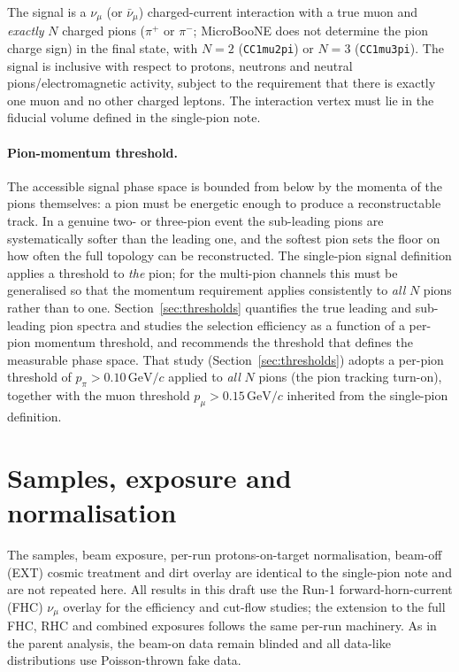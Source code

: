 \documentclass[11pt,a4paper]{article}
\newcommand{\uboone}{MicroBooNE}
\newcommand{\GeVc}{\,\text{GeV}\!/c}
\begin{document}
The signal is a $\nu_\mu$ (or $\bar\nu_\mu$) charged-current interaction with a
true muon and \emph{exactly} $N$ charged pions ($\pi^+$ or $\pi^-$; \uboone{} does not
determine the pion charge sign) in the final state, with $N=2$ (\texttt{CC1mu2pi}) or
$N=3$ (\texttt{CC1mu3pi}). The signal is inclusive with respect to protons, neutrons and
neutral pions/electromagnetic activity, subject to the requirement that there is exactly
one muon and no other charged leptons. The interaction vertex must lie in the fiducial
volume defined in the single-pion note.

\paragraph{Pion-momentum threshold.} The accessible signal phase space is bounded from
below by the momenta of the pions themselves: a pion must be energetic enough to produce
a reconstructable track. In a genuine two- or three-pion event the sub-leading pions are
systematically softer than the leading one, and the softest pion sets the floor on how
often the full topology can be reconstructed. The single-pion signal definition applies
a threshold to \emph{the} pion; for the multi-pion channels this must be generalised so
that the momentum requirement applies consistently to \emph{all} $N$ pions rather than to
one. Section~\ref{sec:thresholds} quantifies the true leading and sub-leading pion
spectra and studies the selection efficiency as a function of a per-pion momentum
threshold, and recommends the threshold that defines the measurable phase space. That study
(Section~\ref{sec:thresholds}) adopts a per-pion threshold of $p_\pi>0.10\GeVc$ applied
to \emph{all} $N$ pions (the pion tracking turn-on), together with the muon threshold
$p_\mu>0.15\GeVc$ inherited from the single-pion definition.

\section{Samples, exposure and normalisation}
\label{sec:samples}

The samples, beam exposure, per-run protons-on-target normalisation, beam-off (EXT)
cosmic treatment and dirt overlay are identical to the single-pion note and are not
repeated here. All results in this draft use the Run-1 forward-horn-current (FHC)
$\nu_\mu$ overlay for the efficiency and cut-flow studies; the extension to the full
FHC, RHC and combined exposures follows the same per-run machinery. As in the parent
analysis, the beam-on data remain blinded and all data-like distributions use
Poisson-thrown fake data.
\end{document}
